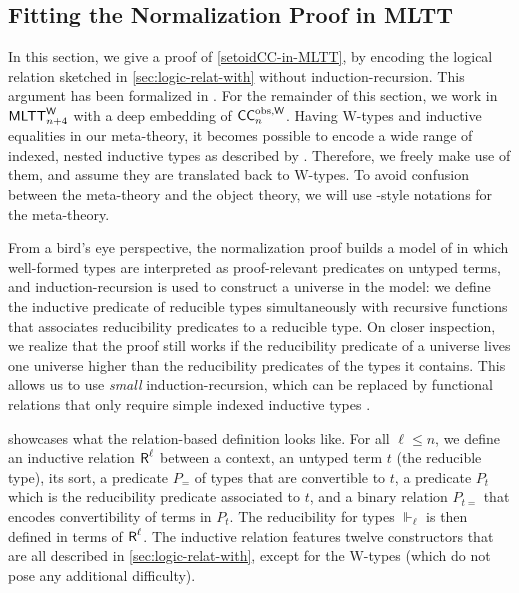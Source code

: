 \subsection{Fitting the Normalization Proof in MLTT}
\label{sec:fitt-norm-proof}

In this section, we give a proof of \cref{setoidCC-in-MLTT}, by
encoding the logical relation sketched in \cref{sec:logic-relat-with}
without induction-recursion.
%
This argument has been formalized in \Agda.
%
For the remainder of this section, we work in \( \mathsf{MLTT}^\mathsf{W}_{n+4} \) with a deep
embedding of \( \mathsf{CC}^{\mathrm{obs}, \mathsf{W}}_n \).
% 
Having \( \mathrm{W} \)-types and inductive equalities in our meta-theory,
it becomes possible to encode a wide range of indexed, nested inductive
types as described by . Therefore, we freely
make use of them, and assume they are translated back to \( \mathrm{W} \)-types.
%
To avoid confusion between the meta-theory and the object theory, we
will use \Agda-style notations for the meta-theory.

From a bird's eye perspective, the normalization proof builds a model
of \SetoidCCW in which well-formed types are interpreted as proof-relevant
predicates on untyped terms, and induction-recursion is used to construct a
universe in the model: we define the inductive predicate of reducible types
simultaneously with recursive functions that associates reducibility
predicates to a reducible type.
%
On closer inspection, we realize that the proof still works if the
reducibility predicate of a universe lives one universe higher than the
reducibility predicates of the types it contains. This allows us to use
\emph{small} induction-recursion, which can be replaced by functional
relations that only require simple indexed inductive types
.

 showcases what the relation-based definition
looks like.
%
For all \( \ell \le n \), we define an inductive relation \( \AgdaData{R}^\ell \) between
a context, an untyped term \( t \) (the reducible type), its sort, a predicate \( P_{=} \) of
types that are convertible to \( t \), a predicate \( P_{t} \) which is the
reducibility predicate associated to \( t \), and a binary relation
\( P_{t=} \) that encodes convertibility of terms in \( P_{t} \).
%
The reducibility for types \( \Vdash_\ell \) is then defined in terms of \( \AgdaData{R}^\ell \).
%
The inductive relation features twelve constructors that are all
described in \cref{sec:logic-relat-with}, except for the \( \mathrm{W} \)-types
(which do not pose any additional difficulty).

